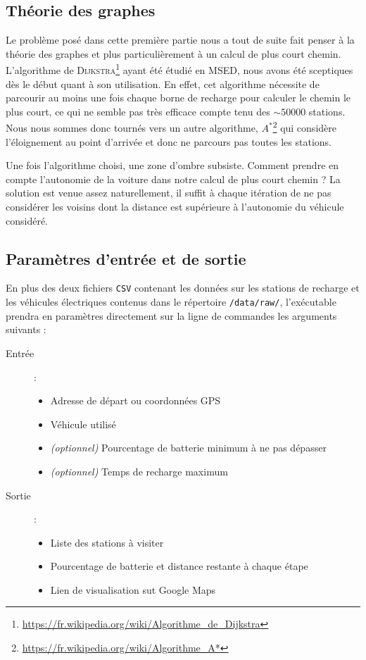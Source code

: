 \documentclass[a4paper, 12pt]{report}
\begin{document}
\subsection{Théorie des graphes}
Le problème posé dans cette première partie nous a tout de suite fait penser à la théorie des graphes et plus particulièrement à un calcul de plus court chemin. L'algorithme de \textsc{Dijkstra}\footnote{\url{https://fr.wikipedia.org/wiki/Algorithme_de_Dijkstra}} ayant été étudié en MSED, nous avons été sceptiques dès le début quant à son utilisation. En effet, cet algorithme nécessite de parcourir au moins une fois chaque borne de recharge pour calculer le chemin le plus court, ce qui ne semble pas très efficace compte tenu des $\sim50 000$ stations. Nous nous sommes donc tournés vers un autre algorithme, $A^*$\footnote{\url{https://fr.wikipedia.org/wiki/Algorithme_A*}} qui considère l'éloignement au point d'arrivée et donc ne parcours pas toutes les stations.\par\bigskip
Une fois l'algorithme choisi, une zone d'ombre subsiste. Comment prendre en compte l'autonomie de la voiture dans notre calcul de plus court chemin ? La solution est venue assez naturellement, il suffit à chaque itération de ne pas considérer les voisins dont la distance est supérieure à l'autonomie du véhicule considéré.
\subsection{Paramètres d'entrée et de sortie}
En plus des deux fichiers \texttt{CSV} contenant les données sur les stations de recharge et les véhicules électriques contenus dans le répertoire \texttt{/data/raw/}, l'exécutable prendra en paramètres directement sur la ligne de commandes les arguments suivants :
\begin{description}
    \item[Entrée] :
        \begin{itemize}
            \item Adresse de départ ou coordonnées GPS
            \item Véhicule utilisé
            \item \textit{(optionnel)} Pourcentage de batterie minimum à ne pas dépasser
            \item \textit{(optionnel)} Temps de recharge maximum
        \end{itemize}
    \item[Sortie] :
        \begin{itemize}
            \item Liste des stations à visiter
            \item Pourcentage de batterie et distance restante à chaque étape
            \item Lien de visualisation sut Google Maps
        \end{itemize}
\end{description}
\clearpage
\end{document}

